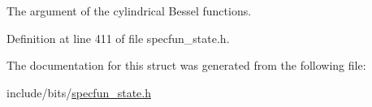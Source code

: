 The argument of the cylindrical Bessel functions. 



Definition at line 411 of file specfun\+\_\+state.\+h.



The documentation for this struct was generated from the following file\+:\begin{DoxyCompactItemize}
\item 
include/bits/\hyperlink{specfun__state_8h}{specfun\+\_\+state.\+h}\end{DoxyCompactItemize}
